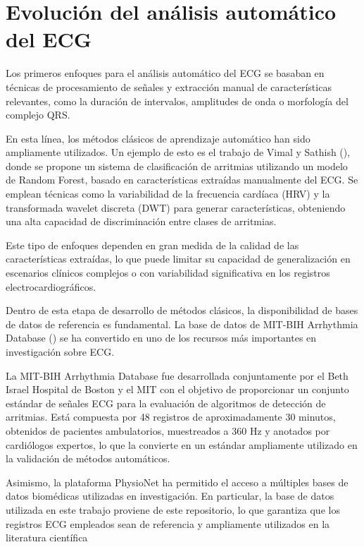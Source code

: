 \documentclass[12pt,a4paper,twoside]{book}
\begin{document}
\section{Evolución del análisis automático del ECG}

Los primeros enfoques para el análisis automático del ECG se basaban en técnicas de procesamiento de señales y extracción manual de características relevantes, como la duración de intervalos, amplitudes de onda o morfología del complejo QRS.

En esta línea, los métodos clásicos de aprendizaje automático han sido ampliamente utilizados.
Un ejemplo de esto es el trabajo de Vimal y Sathish (\cite{vimal_sathish_ecg_rf}), donde se propone un sistema de clasificación de arritmias utilizando un modelo de Random Forest, basado en características extraídas manualmente del ECG.
Se emplean técnicas como la variabilidad de la frecuencia cardíaca (HRV) y la transformada wavelet discreta (DWT) para generar características, obteniendo una alta capacidad de discriminación entre clases de arritmias.

Este tipo de enfoques dependen en gran medida de la calidad de las características extraídas, lo que puede limitar su capacidad de generalización en escenarios clínicos complejos o con variabilidad significativa en los registros electrocardiográficos.

Dentro de esta etapa de desarrollo de métodos clásicos, la disponibilidad de bases de datos de referencia es fundamental.
La base de datos de MIT-BIH Arrhythmia Database (\cite{mitdb_physionet}) se ha convertido en uno de los recursos más importantes en investigación sobre ECG.

La MIT-BIH Arrhythmia Database fue desarrollada conjuntamente por el Beth Israel Hospital de Boston y el MIT con el objetivo de proporcionar un conjunto estándar de señales ECG para la evaluación de algoritmos de detección de arritmias. 
Está compuesta por 48 registros de aproximadamente 30 minutos, obtenidos de pacientes ambulatorios, muestreados a 360 Hz y anotados por cardiólogos expertos, lo que la convierte en un estándar ampliamente utilizado en la validación de métodos automáticos.

Asimismo, la plataforma PhysioNet ha permitido el acceso a múltiples bases de datos biomédicas utilizadas en investigación. 
En particular, la base de datos utilizada en este trabajo proviene de este repositorio, lo que garantiza que los registros ECG empleados sean de referencia y ampliamente utilizados en la literatura científica
\end{document}
